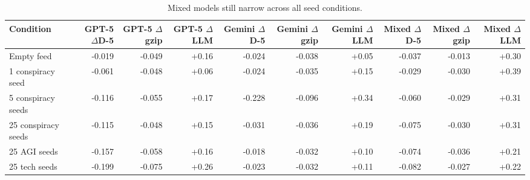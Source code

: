 \documentclass[11pt]{article}
\begin{document}
\begin{table}[t]
\centering
\caption{Mixed models still narrow across all seed conditions.}
\label{tab:mixed-models}
\scriptsize
\setlength{\tabcolsep}{3pt}
\begin{adjustbox}{max width=\textwidth}
\begin{tabular}{lrrrrrrrrr}
\toprule
Condition & GPT-5 $\Delta$D-5 & GPT-5 $\Delta$gzip & GPT-5 $\Delta$LLM
& Gemini $\Delta$D-5 & Gemini $\Delta$gzip & Gemini $\Delta$LLM
& Mixed $\Delta$D-5 & Mixed $\Delta$gzip & Mixed $\Delta$LLM \\
\midrule
Empty feed & -0.019 & -0.049 & +0.16 & -0.024 & -0.038 & +0.05 & -0.037 & -0.013 & +0.30 \\
1 conspiracy seed & -0.061 & -0.048 & +0.06 & -0.024 & -0.035 & +0.15 & -0.029 & -0.030 & +0.39 \\
5 conspiracy seeds & -0.116 & -0.055 & +0.17 & -0.228 & -0.096 & +0.34 & -0.060 & -0.029 & +0.31 \\
25 conspiracy seeds & -0.115 & -0.048 & +0.15 & -0.031 & -0.036 & +0.19 & -0.075 & -0.030 & +0.31 \\
25 AGI seeds & -0.157 & -0.058 & +0.16 & -0.018 & -0.032 & +0.10 & -0.074 & -0.036 & +0.21 \\
25 tech seeds & -0.199 & -0.075 & +0.26 & -0.023 & -0.032 & +0.11 & -0.082 & -0.027 & +0.22 \\
\bottomrule
\end{tabular}
\end{adjustbox}
\end{table} 
\end{document}
